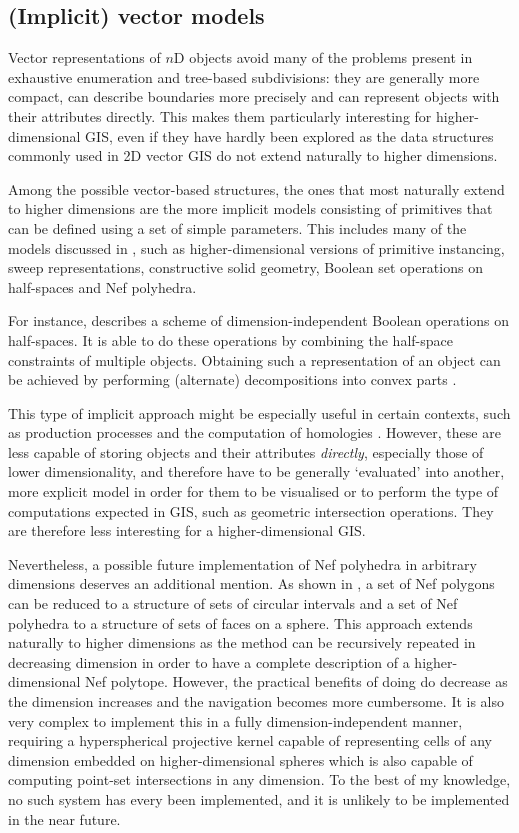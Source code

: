 \subsection{(Implicit) vector models}
\label{ss:implicit-models}

Vector representations of $n$D objects avoid many of the problems present in exhaustive enumeration and tree-based subdivisions: they are generally more compact, can describe boundaries more precisely and can represent objects with their attributes directly.
This makes them particularly interesting for higher-dimensional GIS, even if they have hardly been explored as the data structures commonly used in 2D vector GIS do not extend naturally to higher dimensions.

Among the possible vector-based structures, the ones that most naturally extend to higher dimensions are the more implicit models consisting of primitives that can be defined using a set of simple parameters.
This includes many of the models discussed in , such as higher-dimensional versions of primitive instancing, sweep representations, constructive solid geometry, Boolean set operations on half-spaces and Nef polyhedra.

For instance, \citet{Paoluzzi04} describes a scheme of dimension-independent Boolean operations on half-spaces.
It is able to do these operations by combining the half-space constraints of multiple objects.
Obtaining such a representation of an object can be achieved by performing (alternate) decompositions into convex parts \citep{Bulbul09a,Lien06}.

This type of implicit approach might be especially useful in certain contexts, such as production processes and the computation of homologies \citep{Damiand08}.
However, these are less capable of storing objects and their attributes \emph{directly}, especially those of lower dimensionality, and therefore have to be generally `evaluated' into another, more explicit model in order for them to be visualised \citep{Mantyla88} or to perform the type of computations expected in GIS, such as geometric intersection operations.
They are therefore less interesting for a higher-dimensional GIS.\@

Nevertheless, a possible future implementation of Nef polyhedra in arbitrary dimensions deserves an additional mention.
As shown in , a set of Nef polygons can be reduced to a structure of sets of circular intervals and a set of Nef polyhedra to a structure of sets of faces on a sphere.
This approach extends naturally to higher dimensions as the method can be recursively repeated in decreasing dimension in order to have a complete description of a higher-dimensional Nef polytope.
However, the practical benefits of doing do decrease as the dimension increases and the navigation becomes more cumbersome.
It is also very complex to implement this in a fully dimension-independent manner, requiring a hyperspherical projective kernel capable of representing cells of any dimension embedded on higher-dimensional spheres which is also capable of computing point-set intersections in any dimension.
To the best of my knowledge, no such system has every been implemented, and it is unlikely to be implemented in the near future.

